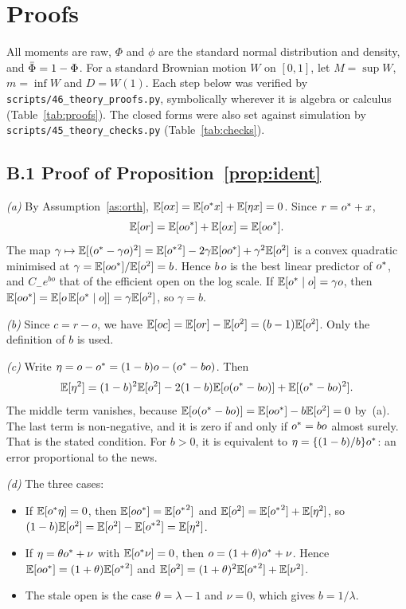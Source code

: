 \section{Proofs}\label{app:proofs}

All moments are raw, $\Phi$ and $\phi$ are the standard normal distribution and density, and
$\bar\Phi=1-\Phi$. For a standard Brownian motion $W$ on $[0,1]$, let $M=\sup W$, $m=\inf W$ and
$D=W(1)$. Each step below was verified by \texttt{scripts/46\_theory\_proofs.py}, symbolically
wherever it is algebra or calculus (Table~\ref{tab:proofs}). The closed forms were also set against
simulation by \texttt{scripts/45\_theory\_checks.py} (Table~\ref{tab:checks}).

\subsection*{B.1 Proof of Proposition~\ref{prop:ident}}

\emph{(a)} By Assumption~\ref{as:orth}, $\mathbb{E}[ox]=\mathbb{E}[{o^{*}} x]+\mathbb{E}[\eta x]=0$. Since $r={o^{*}}+x$,
\[
  \mathbb{E}[or]=\mathbb{E}[o{o^{*}}]+\mathbb{E}[ox]=\mathbb{E}[o{o^{*}}].
\]
The map $\gamma\mapsto\mathbb{E}[({o^{*}}-\gamma o)^2]=\mathbb{E}[{o^{*}}^2]-2\gamma\mathbb{E}[o{o^{*}}]+\gamma^2\mathbb{E}[o^2]$ is a convex
quadratic minimised at $\gamma=\mathbb{E}[o{o^{*}}]/\mathbb{E}[o^2]=b$. Hence $b\,o$ is the best linear predictor of
${o^{*}}$, and $C_{-}e^{b o}$ that of the efficient open on the log scale. If $\mathbb{E}[{o^{*}}\mid o]=\gamma o$,
then $\mathbb{E}[o{o^{*}}]=\mathbb{E}[o\,\mathbb{E}[{o^{*}}\mid o]]=\gamma\mathbb{E}[o^2]$, so $\gamma=b$.

\emph{(b)} Since $c=r-o$, we have $\mathbb{E}[oc]=\mathbb{E}[or]-\mathbb{E}[o^2]=(b-1)\mathbb{E}[o^2]$. Only the definition of
$b$ is used.

\emph{(c)} Write $\eta=o-{o^{*}}=(1-b)o-({o^{*}}-bo)$. Then
\[
  \mathbb{E}[\eta^2]=(1-b)^2\mathbb{E}[o^2]-2(1-b)\mathbb{E}[o({o^{*}}-bo)]+\mathbb{E}[({o^{*}}-bo)^2].
\]
The middle term vanishes, because $\mathbb{E}[o({o^{*}}-bo)]=\mathbb{E}[o{o^{*}}]-b\mathbb{E}[o^2]=0$ by~(a). The last term is
non-negative, and it is zero if and only if ${o^{*}}=bo$ almost surely. That is the stated condition.
For $b>0$, it is equivalent to $\eta=\{(1-b)/b\}{o^{*}}$: an error proportional to the news.

\emph{(d)} The three cases:
\begin{itemize}
  \item If $\mathbb{E}[{o^{*}}\eta]=0$, then $\mathbb{E}[o{o^{*}}]=\mathbb{E}[{o^{*}}^2]$ and $\mathbb{E}[o^2]=\mathbb{E}[{o^{*}}^2]+\mathbb{E}[\eta^2]$, so
        $(1-b)\mathbb{E}[o^2]=\mathbb{E}[o^2]-\mathbb{E}[{o^{*}}^2]=\mathbb{E}[\eta^2]$.
  \item If $\eta=\theta{o^{*}}+\nu$ with $\mathbb{E}[{o^{*}}\nu]=0$, then $o=(1+\theta){o^{*}}+\nu$. Hence
        $\mathbb{E}[o{o^{*}}]=(1+\theta)\mathbb{E}[{o^{*}}^2]$ and $\mathbb{E}[o^2]=(1+\theta)^2\mathbb{E}[{o^{*}}^2]+\mathbb{E}[\nu^2]$.
  \item The stale open is the case $\theta=\lambda-1$ and $\nu=0$, which gives $b=1/\lambda$.
\end{itemize}

